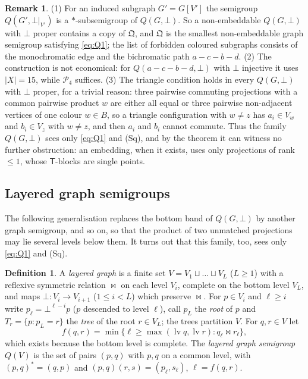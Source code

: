 \documentclass[11pt]{amsart}
\theoremstyle{definition}
\newtheorem{definition}[theorem]{Definition}
\newtheorem{remark}[theorem]{Remark}
\renewcommand{\P}{\mathcal{P}}      %
\newcommand{\T}{\mathsf{T}}
\newcommand{\mt}{\bowtie}      %
\newcommand{\Wire}{\textup{(Sq)}}      %
\begin{document}
\begin{remark}\label{rem:graphthm}
(1) For an induced subgraph $G'=G[V']$ the semigroup $Q(G',\bot|_{V'})$ is a $*$-subsemigroup of $Q(G,\bot)$. So a non-embeddable $Q(G,\bot)$ with $\bot$ proper contains a copy of $\mathfrak Q$, and $\mathfrak Q$ is the smallest non-embeddable graph semigroup satisfying \eqref{eq:Q1}; the list of forbidden coloured subgraphs consists of the monochromatic edge and the bichromatic path $a-c-b-d$. (2) The construction is not economical: for $Q(a-c-b-d,\bot)$ with $\bot$ injective it uses $|X|=15$, while $\P_4$ suffices. (3) The triangle condition holds in every $Q(G,\bot)$ with $\bot$ proper, for a trivial reason: three pairwise commuting projections with a common pairwise product $w$ are either all equal or three pairwise non-adjacent vertices of one colour $w\in B$, so a triangle configuration with $w\ne z$ has $a_i\in V_w$ and $b_i\in V_z$ with $w\ne z$, and then $a_i$ and $b_i$ cannot commute. Thus the family $Q(G,\bot)$ sees only \eqref{eq:Q1} and \Wire, and by the theorem it can witness no further obstruction: an embedding, when it exists, uses only projections of rank $\le1$, whose $\T$-blocks are single points.
\end{remark}

\subsection{Layered graph semigroups}\label{subsec:layered}

The following generalisation replaces the bottom band of $Q(G,\bot)$ by another graph semigroup, and so on, so that the product of two unmatched projections may lie several levels below them. It turns out that this family, too, sees only \eqref{eq:Q1} and \Wire.

\begin{definition}\label{def:layered}
A \emph{layered graph} is a finite set $V=V_1\sqcup\dots\sqcup V_L$ ($L\ge1$) with a reflexive symmetric relation $\mt$ on each level $V_i$, complete on the bottom level $V_L$, and maps $\bot\colon V_i\to V_{i+1}$ ($1\le i<L$) which preserve $\mt$. For $p\in V_i$ and $\ell\ge i$ write $p_\ell=\bot^{\ell-i}p$ ($p$ descended to level $\ell$), call $p_L$ the \emph{root} of $p$ and $T_r=\{p:p_L=r\}$ the \emph{tree} of the root $r\in V_L$; the trees partition $V$. For $q,r\in V$ let
\[
f(q,r)=\min\{\ell\ge\max(\operatorname{lv}q,\operatorname{lv}r): q_\ell\mt r_\ell\},
\]
which exists because the bottom level is complete. The \emph{layered graph semigroup} $Q(V)$ is the set of pairs $(p,q)$ with $p,q$ on a common level, with $(p,q)^*=(q,p)$ and $(p,q)(r,s)=(p_\ell,s_\ell)$, $\ell=f(q,r)$.
\end{definition}
\end{document}
